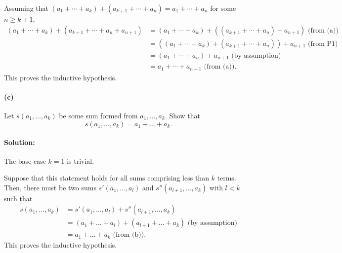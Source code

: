 \documentclass{article}
\begin{document}
Assuming that $(a_1 + \cdots + a_k) + (a_{k+1} + \cdots + a_n) = a_1 + \cdots +
a_n$ for some $n \geq k + 1$, \begin{align*}
  (a_1 + \cdots + a_k) + (a_{k+1} + \cdots + a_n + a_{n+1}) &= (a_1 + \cdots +
  a_k) + ((a_{k+1} + \cdots + a_n) + a_{n+1}) \text{ (from (a))} \\
    &= ((a_1 + \cdots + a_k) + (a_{k+1} + \cdots + a_n)) + a_{n+1} \text{ (from
    P1)} \\
    &= (a_1 + \cdots + a_n) + a_{n+1} \text{ (by assumption)} \\
    &= a_1 + \cdots + a_{n+1} \text{ (from (a))}.
\end{align*} This proves the inductive hypothesis.

\paragraph{(c)} Let $s(a_1, \ldots, a_k)$ be some sum formed from
$a_1, \ldots, a_k$. Show that \begin{equation*}
  s(a_1, \ldots, a_k) = a_1 + \ldots + a_k.
\end{equation*}

\paragraph{Solution:} The base case $k = 1$ is trivial.

Suppose that this statement holds for all sums comprising less than $k$ terms.
Then, there must be two sums $s'(a_1, \ldots, a_l)$ and $s''(a_{l+1}, \ldots,
a_k)$ with $l < k$ such that \begin{align*}
  s(a_1, \ldots, a_k) &= s'(a_1, \ldots, a_l) + s''(a_{l+1}, \ldots, a_k) \\
    &= (a_1 + \ldots + a_l) + (a_{l+1} + \ldots + a_k) \text{ (by assumption)}
    \\
    &= a_1 + \ldots + a_k \text{ (from (b))}.
\end{align*} This proves the inductive hypothesis.
\end{document}
